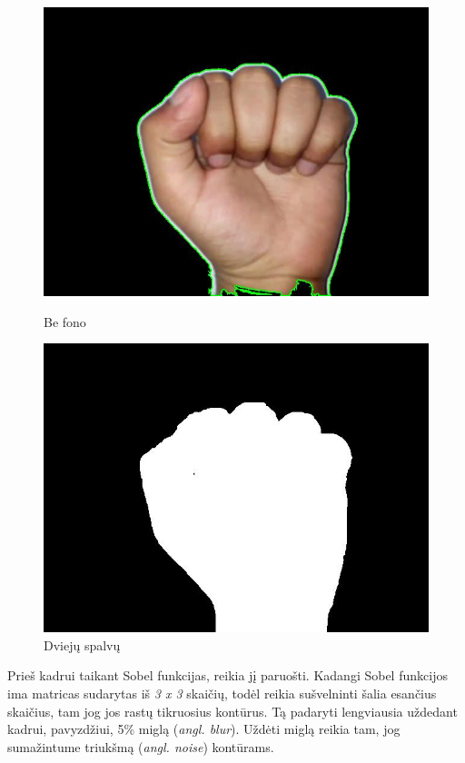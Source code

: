 \documentclass{VUMIFInfKursinis}
\begin{document}
\begin{figure}[H]
	\begin{minipage}{.3\textwidth}
		\centering
		\includegraphics[width=.8\linewidth]{img/A-black}
		\caption{Be fono}
		\label{img:a-black-sign}
	\end{minipage}\hspace{\fill}%
	\begin{minipage}{.3\textwidth}
		\centering
		\includegraphics[width=.8\linewidth]{img/A-white}
		\caption{Dviejų spalvų}
		\label{img:a-white-sign}
	\end{minipage}
\end{figure}

Prieš kadrui taikant Sobel funkcijas, reikia jį paruošti. Kadangi Sobel funkcijos ima matricas sudarytas iš \textit{3 x 3} skaičių, todėl reikia sušvelninti šalia esančius skaičius, tam jog jos rastų tikruosius kontūrus. Tą padaryti lengviausia uždedant kadrui, pavyzdžiui, 5\% miglą (\textit{angl. blur}). Uždėti miglą reikia tam, jog sumažintume triukšmą (\textit{angl. noise}) kontūrams. 
\end{document}

